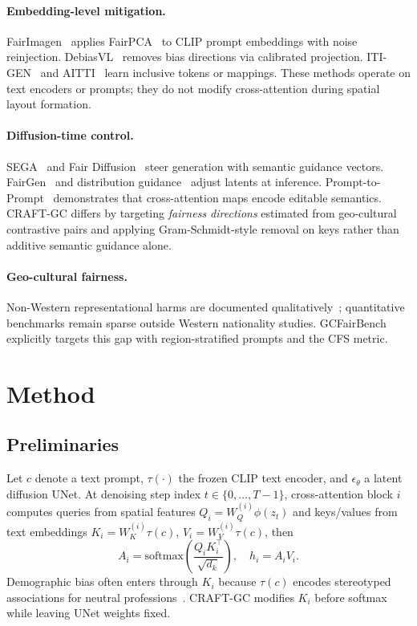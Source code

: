 \documentclass[11pt,a4paper]{article}
\begin{document}
\paragraph{Embedding-level mitigation.}
FairImagen~\cite{fu2025fairimagen} applies FairPCA~\cite{kleindessner2023fairpca} to CLIP prompt embeddings with noise reinjection. DebiasVL~\cite{chuang2023debiasvl} removes bias directions via calibrated projection. ITI-GEN~\cite{zhang2023itigen} and AITTI~\cite{hou2026aitti} learn inclusive tokens or mappings. These methods operate on text encoders or prompts; they do not modify cross-attention during spatial layout formation.

\paragraph{Diffusion-time control.}
SEGA~\cite{brack2023sega} and Fair Diffusion~\cite{friedrich2023fairdiffusion} steer generation with semantic guidance vectors. FairGen~\cite{kang2025fairgen} and distribution guidance~\cite{parihar2024balancing} adjust latents at inference. Prompt-to-Prompt~\cite{hertz2022prompt2prompt} demonstrates that cross-attention maps encode editable semantics. CRAFT-GC differs by targeting \emph{fairness directions} estimated from geo-cultural contrastive pairs and applying Gram-Schmidt-style removal on keys rather than additive semantic guidance alone.

\paragraph{Geo-cultural fairness.}
Non-Western representational harms are documented qualitatively~\cite{ghosh2024nonwestern}; quantitative benchmarks remain sparse outside Western nationality studies. GCFairBench explicitly targets this gap with region-stratified prompts and the CFS metric.

\section{Method}
\label{sec:method}

\subsection{Preliminaries}
Let $c$ denote a text prompt, $\tau(\cdot)$ the frozen CLIP text encoder, and $\epsilon_\theta$ a latent diffusion UNet. At denoising step index $t \in \{0,\ldots,T-1\}$, cross-attention block $i$ computes queries from spatial features $Q_i = W_Q^{(i)} \phi(z_t)$ and keys/values from text embeddings $K_i = W_K^{(i)} \tau(c)$, $V_i = W_V^{(i)} \tau(c)$, then
\begin{equation}
  A_i = \mathrm{softmax}\!\left(\frac{Q_i K_i^\top}{\sqrt{d_k}}\right), \quad h_i = A_i V_i.
  \label{eq:cross-attn}
\end{equation}
Demographic bias often enters through $K_i$ because $\tau(c)$ encodes stereotyped associations for neutral professions~\cite{bolukbasi2016debiasing}. CRAFT-GC modifies $K_i$ before softmax while leaving UNet weights fixed.
\end{document}
